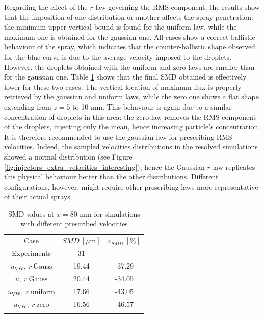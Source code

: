 Regarding the effect of the $r$ law governing the RMS component, the results show that the imposition of one distribution or another affects the spray penetration: the minimum upper vertical bound is found for the uniform law,  while the maximum one is obtained for the gaussian one. All cases show a correct ballistic behaviour of the spray, which indicates that the counter-ballistic shape observed for the blue curve is due to the average velocity imposed to the droplets. However, the droplets obtained with the uniform and zero laws are smaller than for the gaussian one. Table \ref{tab:SMD_deviations_spray_velocities}  shows that the final SMD obtained is effectively lower for these two cases. The vertical location of maximum flux is properly retrieved by the gaussian and uniform laws, while the zero one shows a flat shape extending from $z = 5$ to 10 mm. This behaviour is again due to a similar concentration of droplets in this area: the zero law removes the RMS component of the droplets, injecting only the mean, hence increasing particle's concentration. It is therefore recommended to use the gaussian law for prescribing RMS velocities. Indeed, the sampled velocities distributions in the resolved simulations showed a normal distribution (see Figure \ref{fig:injectors_extra_velocities_interesting}), hence the Gaussian $r$ law replicates this physical behaviour better than the other distributions. Different configurations, however, might require other prescribing laws more representative of their actual sprays.

\clearpage


\begin{table}[!h]
\centering
\caption{SMD values at $x = 80$ mm for simulations with different prescribed velocities}
\begin{tabular}{ccc}
\thickhline
Case & $SMD~\left[\mu \mathrm{m} \right]$ & $\varepsilon_{SMD}~\left[\% \right]$ \\
\thickhline
Experiments & 31 & - \\
$u_\mathrm{VW},~r~\mathrm{Gauss}$ & 19.44 & -37.29 \\
$\overline{u},~r~\mathrm{Gauss}$ & 20.44 & -34.05 \\
$u_\mathrm{VW},~r~\mathrm{uniform}$ & 17.66 & -43.05 \\
$u_\mathrm{VW},~r~\mathrm{zero}$ & 16.56 & -46.57 \\
\thickhline
\end{tabular}
\label{tab:SMD_deviations_spray_velocities}
\end{table}


